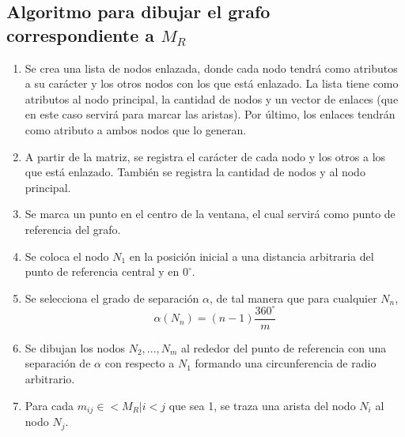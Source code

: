 \documentclass[12pt]{article}
\begin{document}
\subsection{Algoritmo para dibujar el grafo correspondiente a $M_{R}$}
\begin{enumerate}
\item Se crea una lista de nodos enlazada, donde cada nodo tendr\'{a} como atributos a su car\'{a}cter y los otros nodos con los que est\'{a} enlazado. La lista tiene como atributos al nodo principal, la cantidad de nodos y un vector de enlaces (que en este caso servir\'{a} para marcar las aristas). Por \'{u}ltimo, los enlaces tendr\'{a}n como atributo a ambos nodos que lo generan.
\item A partir de la matriz, se registra el car\'{a}cter de cada nodo y los otros a los que est\'{a} enlazado. Tambi\'{e}n se registra la cantidad de nodos y al nodo principal.
\item Se marca un punto en el centro de la ventana, el cual servir\'{a} como punto de referencia del grafo. 
\item Se coloca el nodo $N_1$ en la posici\'{o}n inicial a una distancia arbitraria del punto de referencia central y en $0^\circ$.
\item Se selecciona el grado de separaci\'{o}n $\alpha$, de tal manera que para cualquier $N_{n}$, $$\alpha(N_{n}) = (n-1)\frac{360^{\circ}}{m}$$
\item Se dibujan los nodos $N_{2}, ..., N_{m}$ al rededor del punto de referencia con una separaci\'{o}n de $\alpha$ con respecto a $N_1$ formando una circunferencia de radio arbitrario.
\item Para cada $m_{ij}\in <M_{R}  \vert  i<j$ que sea 1, se traza una arista del nodo $N_{i}$ al nodo $N_{j}$.
\end{enumerate}
\newpage
\end{document}
